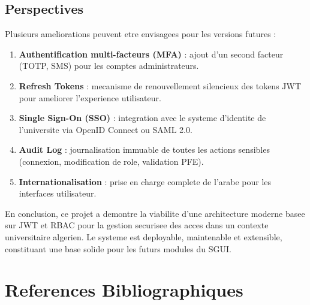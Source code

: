 \documentclass[12pt,a4paper]{report}
\begin{document}
\section*{Perspectives}

Plusieurs ameliorations peuvent etre envisagees pour les versions
futures :

\begin{enumerate}
  \item \textbf{Authentification multi-facteurs (MFA)} : ajout d'un
        second facteur (TOTP, SMS) pour les comptes administrateurs.
  \item \textbf{Refresh Tokens} : mecanisme de renouvellement silencieux
        des tokens JWT pour ameliorer l'experience utilisateur.
  \item \textbf{Single Sign-On (SSO)} : integration avec le systeme
        d'identite de l'universite via OpenID Connect ou SAML 2.0.
  \item \textbf{Audit Log} : journalisation immuable de toutes les
        actions sensibles (connexion, modification de role, validation
        PFE).
  \item \textbf{Internationalisation} : prise en charge complete de
        l'arabe pour les interfaces utilisateur.
\end{enumerate}

\vspace{1cm}

En conclusion, ce projet a demontre la viabilite d'une architecture
moderne basee sur JWT et RBAC pour la gestion securisee des acces dans
un contexte universitaire algerien. Le systeme est deployable,
maintenable et extensible, constituant une base solide pour les futurs
modules du SGUI.

\chapter*{References Bibliographiques}
\end{document}
